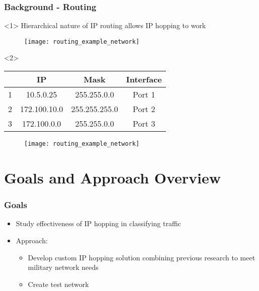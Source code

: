 \documentclass{beamer}
\begin{document}
\begin{frame}
	\frametitle{Background - Routing}

	\begin{onlyenv}
	Hierarchical nature of IP routing allows IP hopping to work
	\begin{figure}
	\centering
	\texttt{[image: routing\_example\_network]}
	\end{figure}
	\end{onlyenv}

	\begin{onlyenv}
	\scriptsize{%
	\begin{table}
	\centering
	\begin{tabular}{rccc}
	\toprule
	 & \textbf{IP} & \textbf{Mask} & \textbf{Interface}\\
	\hline
	1 & 10.5.0.25 & 255.255.0.0 & Port 1\\
	2 & 172.100.10.0 & 255.255.255.0 & Port 2\\
	3 & 172.100.0.0 & 255.255.0.0 & Port 3\\
	\bottomrule
	\end{tabular}
	\end{table}%
	}
	\vspace{-25pt}
	\begin{figure}
	\centering
	\texttt{[image: routing\_example\_network]}
	\end{figure}
	\end{onlyenv}
\end{frame}

\section{Goals and Approach Overview}
\begin{frame}
	\frametitle{Goals}

	\begin{itemize}
	\item Study effectiveness of IP hopping in classifying traffic
	\item Approach:
		\begin{itemize}
		\item Develop custom IP hopping solution combining previous research to meet military network needs
		\item Create test network
		\end{itemize}
	\end{itemize}
\end{frame}
\end{document}
